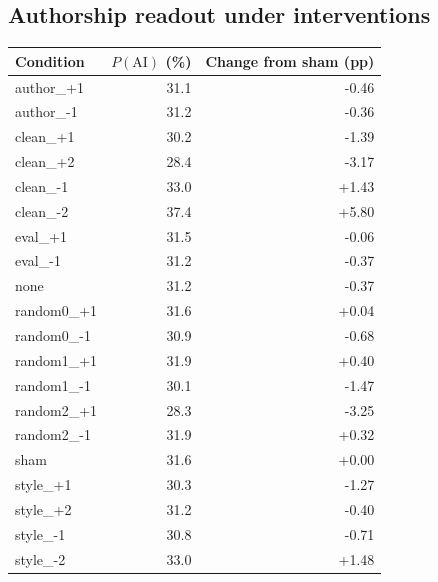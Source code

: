 \subsection{Authorship readout under interventions}\begin{center}\small\begin{tabular}{lrr}\toprule Condition & $P(\mathrm{AI})$ (\%) & Change from sham (pp)\\\midrule

author\_+1 & 31.1 & -0.46\\

author\_-1 & 31.2 & -0.36\\

clean\_+1 & 30.2 & -1.39\\

clean\_+2 & 28.4 & -3.17\\

clean\_-1 & 33.0 & +1.43\\

clean\_-2 & 37.4 & +5.80\\

eval\_+1 & 31.5 & -0.06\\

eval\_-1 & 31.2 & -0.37\\

none & 31.2 & -0.37\\

random0\_+1 & 31.6 & +0.04\\

random0\_-1 & 30.9 & -0.68\\

random1\_+1 & 31.9 & +0.40\\

random1\_-1 & 30.1 & -1.47\\

random2\_+1 & 28.3 & -3.25\\

random2\_-1 & 31.9 & +0.32\\

sham & 31.6 & +0.00\\

style\_+1 & 30.3 & -1.27\\

style\_+2 & 31.2 & -0.40\\

style\_-1 & 30.8 & -0.71\\

style\_-2 & 33.0 & +1.48\\

\bottomrule\end{tabular}\end{center}


